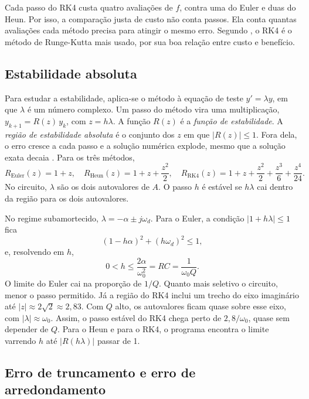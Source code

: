 Cada passo do RK4 custa quatro avaliações de \(f\), contra uma do Euler e duas do Heun. Por isso, a comparação justa de custo não conta passos. Ela conta quantas avaliações cada método precisa para atingir o mesmo erro. Segundo \textcite[seção~10.3.2]{aquino2020}, o RK4 é o método de Runge-Kutta mais usado, por sua boa relação entre custo e benefício.

\subsection{Estabilidade absoluta}
\label{sec:estabilidade}

Para estudar a estabilidade, aplica-se o método à equação de teste \(y'=\lambda y\), em que \(\lambda\) é um número complexo. Um passo do método vira uma multiplicação, \(y_{k+1}=R(z)\,y_k\), com \(z=h\lambda\). A função \(R(z)\) é a \emph{função de estabilidade}. A \emph{região de estabilidade absoluta} é o conjunto dos \(z\) em que \(|R(z)|\le 1\). Fora dela, o erro cresce a cada passo e a solução numérica explode, mesmo que a solução exata decaia \cite{burden2008}. Para os três métodos,
\begin{equation}
R_{\text{Euler}}(z)=1+z,\quad
R_{\text{Heun}}(z)=1+z+\frac{z^{2}}{2},\quad
R_{\text{RK4}}(z)=1+z+\frac{z^{2}}{2}+\frac{z^{3}}{6}+\frac{z^{4}}{24}.
\label{eq:Rz}
\end{equation}
No circuito, \(\lambda\) são os dois autovalores de \(A\). O passo \(h\) é estável se \(h\lambda\) cai dentro da região para os dois autovalores.

No regime subamortecido, \(\lambda=-\alpha\pm j\omega_d\). Para o Euler, a condição \(|1+h\lambda|\le 1\) fica
\[
(1-h\alpha)^{2}+(h\omega_d)^{2}\le 1,
\]
e, resolvendo em \(h\),
\begin{equation}
0<h\le\frac{2\alpha}{\omega_0^{2}}=RC=\frac{1}{\omega_0 Q}.
\label{eq:heuler}
\end{equation}
O limite do Euler cai na proporção de \(1/Q\). Quanto mais seletivo o circuito, menor o passo permitido. Já a região do RK4 inclui um trecho do eixo imaginário até \(|z|\approx 2\sqrt{2}\approx 2{,}83\). Com \(Q\) alto, os autovalores ficam quase sobre esse eixo, com \(|\lambda|\approx\omega_0\). Assim, o passo estável do RK4 chega perto de \(2{,}8/\omega_0\), quase sem depender de \(Q\). Para o Heun e para o RK4, o programa encontra o limite varrendo \(h\) até \(|R(h\lambda)|\) passar de 1.

\subsection{Erro de truncamento e erro de arredondamento}

